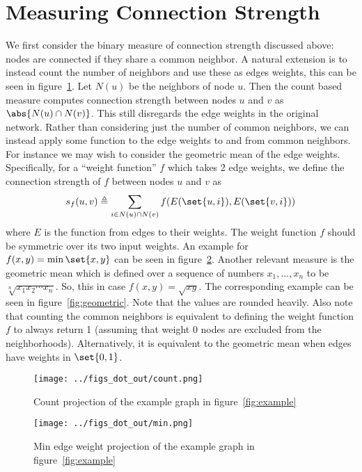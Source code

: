 \documentclass{pset}
\begin{document}
\section*{Measuring Connection Strength}

We first consider the binary measure of connection strength discussed above:
nodes are connected if they share a common neighbor. A natural extension is to
instead count the number of neighbors and use these as edges weights, this can
be seen in figure~\ref{fig:count}. Let $N(u)$ be the neighbors of node $u$.
Then the count based measure computes connection strength between nodes $u$ and $v$
as $\abs{N(u) \cap N(v)}$. 
This still disregards the edge weights in the original network. 
Rather than considering just the number of common neighbors,
we can instead apply some function to the edge weights to and from common neighbors.
For instance we may wish to consider the geometric mean of the edge weights.
Specifically, for a ``weight function'' $f$ which takes 2 edge weights,
we define the connection strength of $f$ between nodes $u$ and $v$ as
\[s_f(u, v) \triangleq \sum_{i \in N(u) \cap N(v)} f(E(\set{u, i}), E(\set{v, i}))\]
where $E$ is the function from edges to their weights.
The weight function $f$ should be symmetric over its two input weights.
An example for $f(x, y) = \min\set{x,y}$ can be seen in figure~\ref{fig:min}.
Another relevant measure is the geometric mean which is defined over
a sequence of numbers $x_1,\ldots,x_n$ to be $\sqrt[n]{x_1 x_2 \cdots x_n}$.
So, this in case $f(x, y) = \sqrt{x y}$.
The corresponding example can be seen in figure~\ref{fig:geometric}.
Note that the values are rounded heavily.
Also note that counting the common neighbors is equivalent to
defining the weight function $f$ to always return 1 (assuming that weight 0 nodes are
excluded from the neighborhoods). Alternatively, it is equivalent to the geometric
mean when edges have weights in $\set{0, 1}$.

\begin{figure}[ht]
\centering
\texttt{[image: ../figs\_dot\_out/count.png]}
\caption{Count projection of the example graph in figure~\ref{fig:example}}\label{fig:count}
\end{figure}

\begin{figure}[ht]
\centering
\texttt{[image: ../figs\_dot\_out/min.png]}
\caption{Min edge weight projection of the example graph in figure~\ref{fig:example}}\label{fig:min}
\end{figure}
\end{document}

